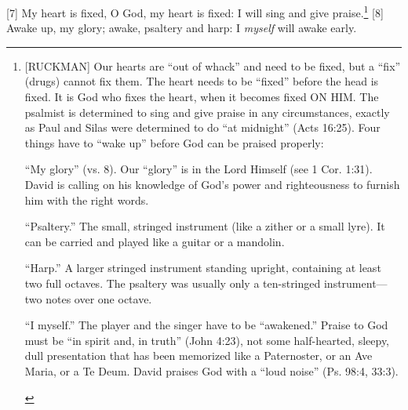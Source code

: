 [7] \textcolor[rgb]{0.00,0.00,1.00}{My heart is fixed, O God, my heart is fixed: I will sing and give praise.}\footnote{[RUCKMAN] Our hearts are “out of whack” and need to be fixed, but a “fix” (drugs) cannot fix them. The heart needs to be “fixed” before the head is fixed. It is God who fixes the heart, when it becomes fixed ON HIM. The psalmist is determined to sing and give praise in any circumstances, exactly as Paul and Silas were determined to do “at midnight” (Acts 16:25). Four things have to “wake up” before God can be praised properly: \cite{Ruckman1992Psalms} 
\begin{compactenum}
    \item “My glory” (vs. 8). Our “glory” is in the Lord Himself (see 1 Cor. 1:31). David is calling on his knowledge of God’s power and righteousness to furnish him with the right words.
    \item “Psaltery.” The small, stringed instrument (like a zither or a small lyre). It can be carried and played like a guitar or a mandolin.
    \item “Harp.” A larger stringed instrument standing upright, containing at least two full octaves. The psaltery was usually only a ten-stringed instrument—two notes over one octave.
    \item “I myself.” The player and the singer have to be “awakened.” Praise to God must be “in spirit and, in truth” (John 4:23), not some half-hearted, sleepy, dull presentation that has been memorized like a Paternoster, or an Ave Maria, or a Te Deum. David praises God with a “loud noise” (Ps. 98:4, 33:3).
\end{compactenum}}
[8] \textcolor[rgb]{0.00,0.00,1.00}{Awake up, my glory; awake, psaltery and harp: I \emph{myself} will awake early.}
